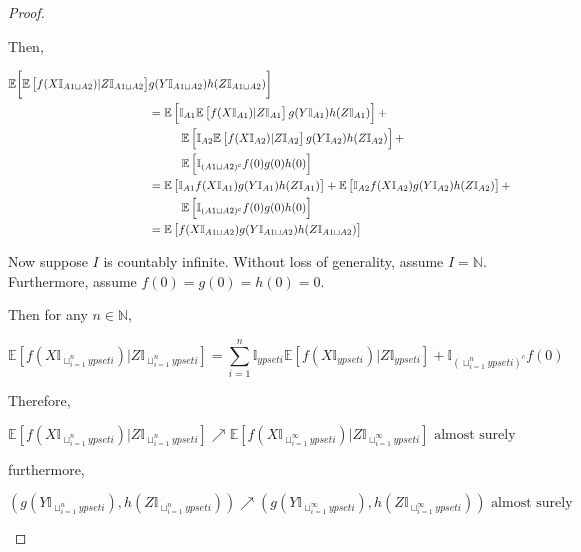 \documentclass[12pt]{article}
\newcommand{\mb}{\mathbb}
\newcommand{\te}{\text}
\newcommand{\ex}[1]{\mb{E}\left[#1\right]}			%
\newcommand{\X}{X}								%
\newcommand{\XX}{Y}								%
\newcommand{\XXX}{Z}							%
\newcommand{\typset}{A}							%
\begin{document}
\begin{proof}
\begin{enumerate}[(a)]
Then,

\begin{align*}
\mb{E}\bigg[\ex{f(\X\mb{I}_{\typset{1}\sqcup \typset{2}})|\XXX\mb{I}_{\typset{1}\sqcup \typset{2}}}&g(\XX\mb{I}_{\typset{1}\sqcup \typset{2}})h(\XXX\mb{I}_{\typset{1}\sqcup \typset{2}})\bigg]\\
&= \ex{\mb{I}_{\typset{1}}\ex{f(\X\mb{I}_{\typset{1}})|\XXX\mb{I}_{\typset{1}}}g(\XX\mb{I}_{\typset{1}})h(\XXX\mb{I}_{\typset{1}})} +\\
&\hspace{1 cm} \ex{\mb{I}_{\typset{2}}\ex{f(\X\mb{I}_{\typset{2}})|\XXX\mb{I}_{\typset{2}}}g(\XX\mb{I}_{\typset{2}})h(\XXX\mb{I}_{\typset{2}})} + \\
&\hspace{1 cm} \ex{\mb{I}_{(\typset{1}\sqcup \typset{2})^c}f(0)g(0)h(0)}\\
&= \ex{\mb{I}_{\typset{1}}f(\X\mb{I}_{\typset{1}})g(\XX\mb{I}_{\typset{1}})h(\XXX\mb{I}_{\typset{1}})} + \ex{\mb{I}_{\typset{2}}f(\X\mb{I}_{\typset{2}})g(\XX\mb{I}_{\typset{2}})h(\XXX\mb{I}_{\typset{2}})} +\\
&\hspace{1 cm} \ex{\mb{I}_{(\typset{1}\sqcup \typset{2})^c}f(0)g(0)h(0)}\\
&= \ex{f(\X\mb{I}_{\typset{1}\sqcup \typset{2}})g(\XX\mb{I}_{\typset{1}\sqcup \typset{2}})h(\XXX\mb{I}_{\typset{1}\sqcup \typset{2}})}
\end{align*}

Now suppose \(I\) is countably infinite. Without loss of generality, assume \(I = \mb{N}\). Furthermore, assume \(f(0) = g(0) = h(0) = 0\).

Then for any \(n \in \mb{N}\),

\[\ex{f(\X\mb{I}_{\sqcup_{i=1}^n 	ypset{i}})|\XXX\mb{I}_{\sqcup_{i=1}^n 	ypset{i}}} = \sum_{i=1}^n \mb{I}_{	ypset{i}}\ex{f(\X\mb{I}_{	ypset{i}})|\XXX\mb{I}_{	ypset{i}}} + \mb{I}_{\left(\sqcup_{i=1}^n 	ypset{i}\right)^c} f(0)\]

Therefore,

\[\ex{f(\X\mb{I}_{\sqcup_{i=1}^n 	ypset{i}})|\XXX\mb{I}_{\sqcup_{i=1}^n 	ypset{i}}} \nearrow \ex{f(\X\mb{I}_{\sqcup_{i=1}^\infty 	ypset{i}})|\XXX\mb{I}_{\sqcup_{i=1}^\infty 	ypset{i}}} \te{ almost surely}\]

furthermore, 

\[(g(\XX\mb{I}_{\sqcup_{i=1}^n 	ypset{i}}),h(\XXX\mb{I}_{\sqcup_{i=1}^n 	ypset{i}})) \nearrow (g(\XX\mb{I}_{\sqcup_{i=1}^\infty 	ypset{i}}),h(\XXX\mb{I}_{\sqcup_{i=1}^\infty  	ypset{i}})) \te{ almost surely}\]


\end{enumerate}
\end{proof}
\end{document}
